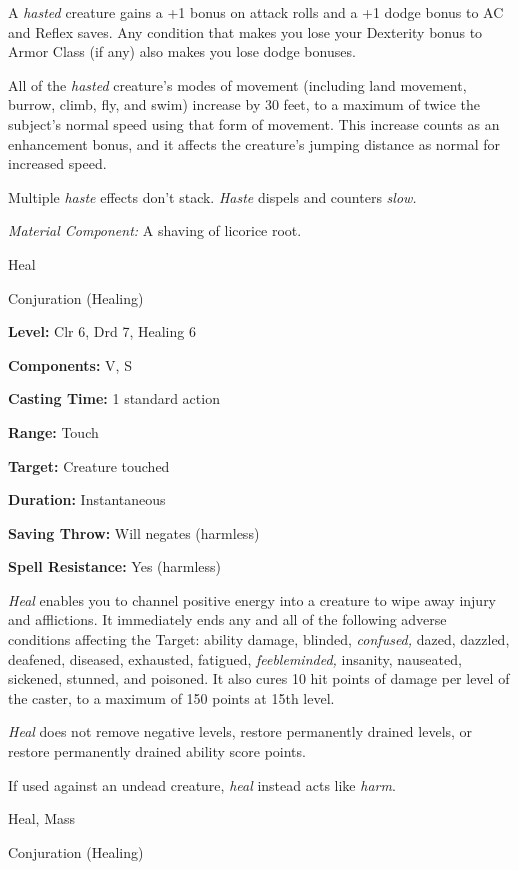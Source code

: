 \documentclass{article}
\begin{document}
A \textit{hasted }creature gains a +1 bonus on attack rolls and a +1 dodge bonus 
to AC and Reflex saves. Any condition that makes you lose your Dexterity bonus 
to Armor Class (if any) also makes you lose dodge bonuses.

All of the \textit{hasted }creature's modes of movement (including land movement, 
burrow, climb, fly, and swim) increase by 30 feet, to a maximum of twice the subject's 
normal speed using that form of movement. This increase counts as an enhancement 
bonus, and it affects the creature's jumping distance as normal for increased speed.

Multiple \textit{haste }effects don't stack. \textit{Haste }dispels and counters 
\textit{slow.}

\textit{Material Component: }A shaving of licorice root.

\vspace{12pt}
Heal

Conjuration (Healing)

\textbf{Level:} Clr 6, Drd 7, Healing 6

\textbf{Components:} V, S

\textbf{Casting Time:} 1 standard action

\textbf{Range:} Touch

\textbf{Target:} Creature touched

\textbf{Duration:} Instantaneous

\textbf{Saving Throw: }Will negates (harmless)

\textbf{Spell Resistance:} Yes (harmless)

\textit{Heal }enables you to channel positive energy into a creature to wipe away 
injury and afflictions. It immediately ends any and all of the following adverse 
conditions affecting the Target: ability damage, blinded, \textit{confused, }dazed, 
dazzled, deafened, diseased, exhausted, fatigued, \textit{feebleminded, }insanity, 
nauseated, sickened, stunned, and poisoned. It also cures 10 hit points of damage 
per level of the caster, to a maximum of 150 points at 15th level.

\textit{Heal }does not remove negative levels, restore permanently drained levels, 
or restore permanently drained ability score points.

If used against an undead creature, \textit{heal }instead acts like \textit{harm}.

\vspace{12pt}
Heal, Mass

Conjuration (Healing)
\end{document}
